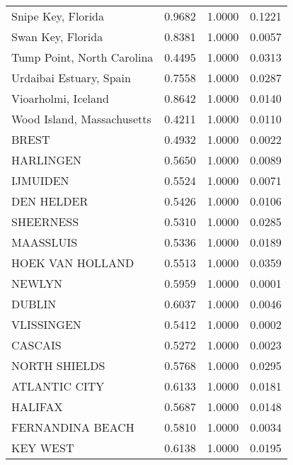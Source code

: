 \begin{table}[ht]
\begin{tabular}{lrrr}
  Snipe Key,
 Florida & 0.9682 & 1.0000 & 0.1221 \\ 
  Swan Key,
 Florida & 0.8381 & 1.0000 & 0.0057 \\ 
  Tump Point,
 North Carolina & 0.4495 & 1.0000 & 0.0313 \\ 
  Urdaibai Estuary,
 Spain & 0.7558 & 1.0000 & 0.0287 \\ 
  Vioarholmi,
 Iceland & 0.8642 & 1.0000 & 0.0140 \\ 
  Wood Island,
 Massachusetts & 0.4211 & 1.0000 & 0.0110 \\ 
  BREST & 0.4932 & 1.0000 & 0.0022 \\ 
  HARLINGEN & 0.5650 & 1.0000 & 0.0089 \\ 
  IJMUIDEN & 0.5524 & 1.0000 & 0.0071 \\ 
  DEN HELDER & 0.5426 & 1.0000 & 0.0106 \\ 
  SHEERNESS & 0.5310 & 1.0000 & 0.0285 \\ 
  MAASSLUIS & 0.5336 & 1.0000 & 0.0189 \\ 
  HOEK VAN HOLLAND & 0.5513 & 1.0000 & 0.0359 \\ 
  NEWLYN & 0.5959 & 1.0000 & 0.0001 \\ 
  DUBLIN & 0.6037 & 1.0000 & 0.0046 \\ 
  VLISSINGEN & 0.5412 & 1.0000 & 0.0002 \\ 
  CASCAIS & 0.5272 & 1.0000 & 0.0023 \\ 
  NORTH SHIELDS & 0.5768 & 1.0000 & 0.0295 \\ 
  ATLANTIC CITY & 0.6133 & 1.0000 & 0.0181 \\ 
  HALIFAX & 0.5687 & 1.0000 & 0.0148 \\ 
  FERNANDINA BEACH & 0.5810 & 1.0000 & 0.0034 \\ 
  KEY WEST & 0.6138 & 1.0000 & 0.0195 \\ 
   \hline
\end{tabular}
\end{table}
